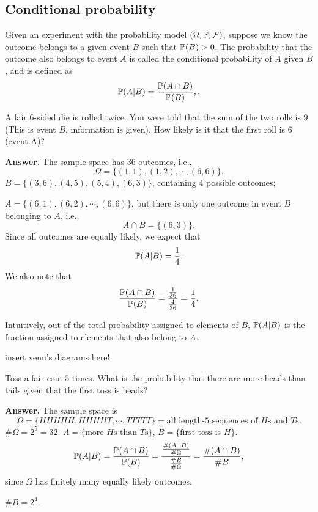 \subsection{Conditional probability}
\label{subsec:cond-prob}
\begin{definition}
  Given an experiment with the probability model $(\Omega,\mathbb{P}, \mathcal{F})$, suppose we
  know the outcome belongs to a given event $B$ such that $\mathbb{P}(B)>0$. The probability that the
  outcome also belongs to event $A$ is called the conditional probability of $A$
  given $B$, and is defined as
  \[
    \mathbb{P}(A| B) = \frac{\mathbb{P}(A\cap B)}{\mathbb{P}(B)},.
  \]
\end{definition}
\begin{example}
  A fair $6$-sided die is rolled twice. You were told that the sum of the two
  rolls is $9$ (This is event $B$, information is given). How likely is it that
  the first roll is $6$ (event A)?
\end{example}
\textbf{Answer.} The sample space has $36$ outcomes, i.e.,
\[
  \Omega = \{(1,1), (1,2), \cdots, (6,6)\}.
\]
$B = \{(3,6), (4,5), (5,4), (6,3)\}$, containing $4$ possible outcomes;

$A = \{(6,1), (6,2),\cdots, (6,6)\}$, but there is only one outcome in event $B$
belonging to $A$, i.e.,
\[
  A\cap B = \{(6,3)\}.
\]
Since all outcomes are equally likely, we expect that
\[
  \mathbb{P}(A | B) = \frac{1}{4}.
\]
We also note that
\[\displaystyle
  \frac{\mathbb{P}(A\cap B)}{\mathbb{P}(B)} = \frac{\frac{1}{36}}{\frac{4}{36}} = \frac{1}{4}.
\]

Intuitively, out of the total probability assigned to elements of $B$,
$\mathbb{P}(A| B)$ is the fraction assigned to elements that also belong to $A$.

{\color{red} insert venn's diagrams here!}

\begin{example}
  Toss a fair coin $5$ times. What is the probability that there are more heads
  than tails given that the first toss is heads?
\end{example}
\textbf{Answer.} The sample space is
\[
  \Omega = \{HHHHH, HHHHT, \cdots, TTTTT\} = \text{all length-$5$ sequences of
    $H$s and $T$s}.
\]
$\# \Omega = 2^5 = 32$. 
$A = \{\text{more $H$s than $T$s}\}$, $B = \{\text{first toss is $H$}\}$.
\[
  \mathbb{P}(A| B) = \frac{\mathbb{P}(A\cap B)}{\mathbb{P}(B)} = \frac{\frac{\# (A\cap B)}{\#
      \Omega}}{\frac{\# B}{\# \Omega}} = \frac{\# (A\cap B)}{\# B}, 
\]
since $\Omega$ has finitely many equally likely outcomes.

$\# B = 2^4$.

